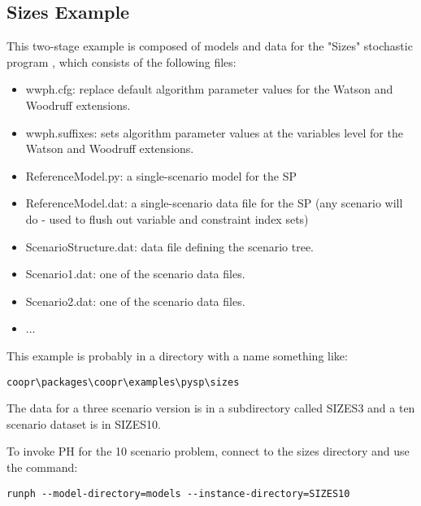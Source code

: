 \subsection{Sizes Example}

This two-stage example is composed of models and data for the "Sizes" stochastic
program \cite{sizes,lokwood}, which consists of the following files:

\begin{itemize}
  \item wwph.cfg: replace default algorithm parameter values for the Watson and
  Woodruff extensions.

  \item wwph.suffixes: sets algorithm parameter values at the variables level
  for the Watson and Woodruff extensions.

  \item ReferenceModel.py: a single-scenario model for the SP

  \item ReferenceModel.dat: a single-scenario data file for the SP (any scenario
  will do - used to flush out variable and constraint index sets)

  \item ScenarioStructure.dat: data file defining the scenario tree.

  \item Scenario1.dat: one of the scenario data files.

  \item Scenario2.dat: one of the scenario data files.

  \item ...
\end{itemize}

This example is probably in a directory with a name something like:

\begin{verbatim}
coopr\packages\coopr\examples\pysp\sizes
\end{verbatim}

The data for a three scenario version is in a subdirectory called SIZES3 and a
ten scenario dataset is in SIZES10.

To invoke PH for the 10 scenario problem, connect to the sizes directory and use
the command:

\begin{verbatim}
runph --model-directory=models --instance-directory=SIZES10
\end{verbatim}


